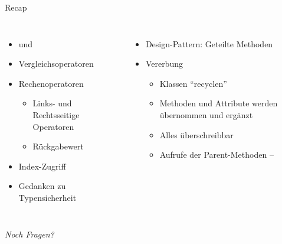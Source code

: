 
\begin{frame}[t,plain]
\titlepage
\end{frame}


\begin{frame}[fragile]{Recap}
%
\begin{columns}[T]
\begin{itemize}
\item {} und 
\item Vergleichsoperatoren
\item Rechenoperatoren
	\begin{itemize}
	\item Links- und Rechtsseitige Operatoren
	\item Rückgabewert 
	\end{itemize}
\item Index-Zugriff
\item Gedanken zu Typensicherheit
\end{itemize}
%
\begin{itemize}
\item Design-Pattern: Geteilte Methoden
\item Vererbung
	\begin{itemize}
	\item Klassen \enquote{recyclen}
	\item Methoden und Attribute werden übernommen und ergänzt
	\item Alles überschreibbar
	\item Aufrufe der Parent-Methoden -- 
	\end{itemize}
\end{itemize}

\end{columns}
%
\begin{center}
	\emph{Noch Fragen?}
\end{center}
%
\end{frame}


